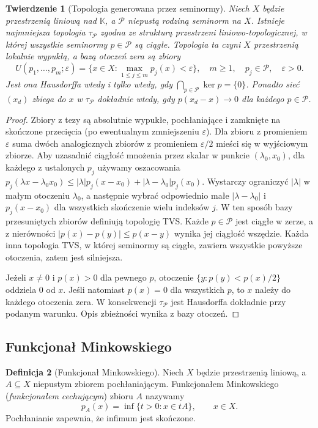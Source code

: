 \documentclass[11pt,a4paper]{article}
\numberwithin{equation}{section}
\theoremstyle{plain}
\newtheorem{twierdzenie}{Twierdzenie}[section]
\theoremstyle{definition}
\newtheorem{definicja}[twierdzenie]{Definicja}
\theoremstyle{remark}
\newcommand{\K}{\mathbb K}
\begin{document}
\begin{twierdzenie}[Topologia generowana przez seminormy]
\label{thm:seminorm-topology}
Niech $X$ będzie przestrzenią liniową nad $\K$, a
$\mathcal P$ niepustą rodziną seminorm na $X$. Istnieje
najmniejsza topologia $\tau_{\mathcal P}$ \emph{zgodna ze
strukturą przestrzeni liniowo-topologicznej}, w której
wszystkie seminormy $p\in\mathcal P$ są ciągłe.
Topologia ta czyni $X$ przestrzenią lokalnie wypukłą,
a bazą otoczeń zera są zbiory
\[
 U(p_1,\ldots,p_m;\varepsilon)
 =\{x\in X:\max_{1\le j\le m}p_j(x)<\varepsilon\},
 \quad m\ge1,\quad p_j\in\mathcal P,\quad\varepsilon>0.
\]
Jest ona Hausdorffa wtedy i tylko wtedy, gdy
$\bigcap_{p\in\mathcal P}\ker p=\{0\}$.
Ponadto sieć $(x_d)$ zbiega do $x$ w $\tau_{\mathcal P}$
dokładnie wtedy, gdy $p(x_d-x)\to0$ dla każdego $p\in\mathcal P$.
\end{twierdzenie}
\begin{proof}
Zbiory z tezy są absolutnie wypukłe, pochłaniające i
zamknięte na skończone przecięcia (po ewentualnym
zmniejszeniu $\varepsilon$). Dla zbioru z promieniem
$\varepsilon$ suma dwóch analogicznych zbiorów z promieniem
$\varepsilon/2$ mieści się w wyjściowym zbiorze.
Aby uzasadnić ciągłość mnożenia przez skalar w punkcie
$(\lambda_0,x_0)$, dla każdego z ustalonych $p_j$
używamy oszacowania
$p_j(\lambda x-\lambda_0x_0)\le
|\lambda|p_j(x-x_0)+|\lambda-\lambda_0|p_j(x_0)$.
Wystarczy ograniczyć $|\lambda|$ w małym otoczeniu
$\lambda_0$, a następnie wybrać odpowiednio małe
$|\lambda-\lambda_0|$ i $p_j(x-x_0)$ dla wszystkich
skończenie wielu indeksów $j$.
W ten sposób bazy przesuniętych zbiorów definiują
topologię TVS.
Każde $p\in\mathcal P$ jest ciągłe w zerze, a z nierówności
$|p(x)-p(y)|\le p(x-y)$ wynika jej ciągłość wszędzie.
Każda inna topologia TVS, w której seminormy są ciągłe,
zawiera wszystkie powyższe otoczenia, zatem jest silniejsza.

Jeżeli $x\ne0$ i $p(x)>0$ dla pewnego $p$, otoczenie
$\{y:p(y)<p(x)/2\}$ oddziela $0$ od $x$.
Jeśli natomiast $p(x)=0$ dla wszystkich $p$, to $x$
należy do każdego otoczenia zera. W konsekwencji
$\tau_{\mathcal P}$ jest Hausdorffa dokładnie przy
podanym warunku. Opis zbieżności wynika z bazy otoczeń.
\end{proof}

\subsection{Funkcjonał Minkowskiego}

\begin{definicja}[Funkcjonał Minkowskiego]
\label{def:gauge}
Niech $X$ będzie przestrzenią liniową, a $A\subseteq X$
niepustym zbiorem pochłaniającym. Funkcjonałem Minkowskiego
(\emph{funkcjonałem cechującym}) zbioru $A$ nazywamy
\[
 p_A(x)=\inf\{t>0:x\in tA\},\qquad x\in X.
\]
Pochłanianie zapewnia, że infimum jest skończone.
\end{definicja}
\end{document}
